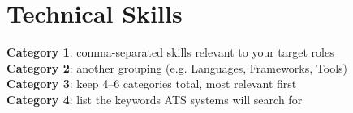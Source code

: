\documentclass[letterpaper,11pt]{article}
\begin{document}
\section{Technical Skills}
 \begin{itemize}[leftmargin=0.15in, label={}]
    \small{\item{
     \textbf{Category 1}{: comma-separated skills relevant to your target roles} \\
     \textbf{Category 2}{: another grouping (e.g. Languages, Frameworks, Tools)} \\
     \textbf{Category 3}{: keep 4--6 categories total, most relevant first} \\
     \textbf{Category 4}{: list the keywords ATS systems will search for}
    }}
 \end{itemize}


\end{document}
